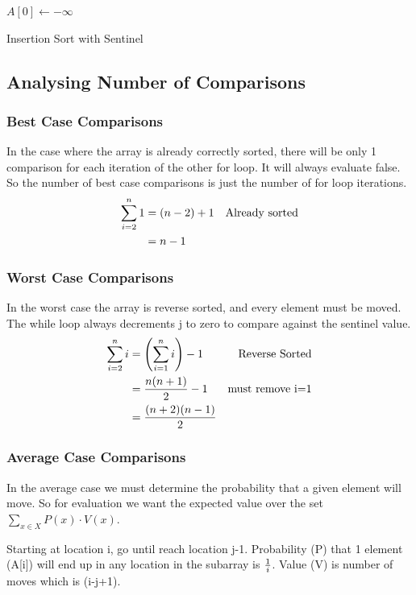 \documentclass[english, 10pt]{article}
\begin{document}
\begin{algorithm}
$A[0] \gets -\infty$\; 
\caption{Insertion Sort with Sentinel}
\end{algorithm}

\subsection{Analysing Number of Comparisons}

\subsubsection{Best Case Comparisons}
In the case where the array is already correctly sorted, there will be only 1 comparison for each iteration of the other for loop.
It will always evaluate false.
So the number of best case comparisons is just the number of for loop iterations.
\begin{align*}
    \sum_{i=2}^{n} 1 &= (n-2)+1 & \text{Already sorted} \\
    &= n-1
\end{align*}

\subsubsection{Worst Case Comparisons}
In the worst case the array is reverse sorted, and every element must be moved.
The while loop always decrements j to zero to compare against the sentinel value.
\begin{align*}
    \sum_{i=2}^n i &= \left(\sum_{i=1}^{n}i \right)-1 & \text{Reverse Sorted} \\
    &= \frac{n(n+1)}{2} -1 & \text{must remove i=1} \\
    &= \frac{(n+2)(n-1)}{2}
\end{align*}

\subsubsection{Average Case Comparisons}
In the average case we must determine the probability that a given element will move.
So for evaluation we want the expected value over the set $\sum_{x \in X} P(x)\cdot V(x) $.

Starting at location i, go until reach location j-1.
Probability (P) that 1 element (A[i]) will end up in any location in the subarray is $\frac{1}{i}$. Value (V) is number of moves which is (i-j+1).
\end{document}
